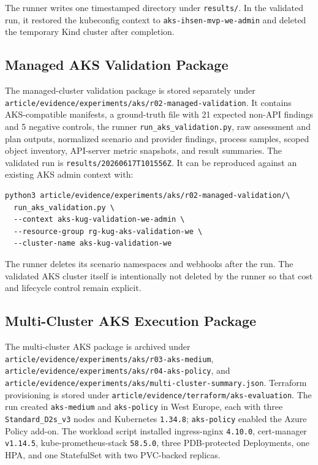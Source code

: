 \documentclass[10pt,journal]{IEEEtran}
\newcommand{\code}[1]{\texttt{#1}}
\begin{document}
The runner writes one timestamped directory under \code{results/}. In the validated run, it restored the kubeconfig context to \code{aks-ihsen-mvp-we-admin} and deleted the temporary Kind cluster after completion.

\subsection{Managed AKS Validation Package}
The managed-cluster validation package is stored separately under \code{article/evidence/experiments/aks/r02-managed-validation}. It contains AKS-compatible manifests, a ground-truth file with 21 expected non-API findings and 5 negative controls, the runner \code{run\_aks\_validation.py}, raw assessment and plan outputs, normalized scenario and provider findings, process samples, scoped object inventory, API-server metric snapshots, and result summaries. The validated run is \code{results/20260617T101556Z}. It can be reproduced against an existing AKS admin context with:

{\scriptsize
\begin{verbatim}
python3 article/evidence/experiments/aks/r02-managed-validation/\
  run_aks_validation.py \
  --context aks-kug-validation-we-admin \
  --resource-group rg-kug-aks-validation-we \
  --cluster-name aks-kug-validation-we
\end{verbatim}
}

The runner deletes its scenario namespaces and webhooks after the run. The validated AKS cluster itself is intentionally not deleted by the runner so that cost and lifecycle control remain explicit.

\subsection{Multi-Cluster AKS Execution Package}
The multi-cluster AKS package is archived under \code{article/evidence/experiments/aks/r03-aks-medium}, \code{article/evidence/experiments/aks/r04-aks-policy}, and \code{article/evidence/experiments/aks/multi-cluster-summary.json}. Terraform provisioning is stored under \code{article/evidence/terraform/aks-evaluation}. The run created \code{aks-medium} and \code{aks-policy} in West Europe, each with three \code{Standard\_D2s\_v3} nodes and Kubernetes \code{1.34.8}; \code{aks-policy} enabled the Azure Policy add-on. The workload script installed ingress-nginx \code{4.10.0}, cert-manager \code{v1.14.5}, kube-prometheus-stack \code{58.5.0}, three PDB-protected Deployments, one HPA, and one StatefulSet with two PVC-backed replicas.
\end{document}
